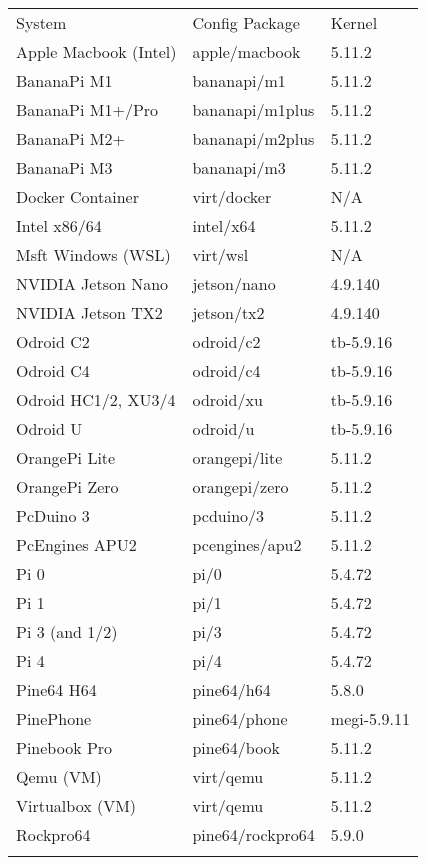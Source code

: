 \documentclass[english,]{IEEEtran}
\let\endhead\relax
\begin{document}
\begin{longtable}[]{@{}lll@{}}
\toprule
System & Config Package & Kernel \\ \addlinespace
\midrule
\endhead
Apple Macbook (Intel) & apple/macbook & 5.11.2 \\ \addlinespace
BananaPi M1 & bananapi/m1 & 5.11.2 \\ \addlinespace
BananaPi M1+/Pro & bananapi/m1plus & 5.11.2 \\ \addlinespace
BananaPi M2+ & bananapi/m2plus & 5.11.2 \\ \addlinespace
BananaPi M3 & bananapi/m3 & 5.11.2 \\ \addlinespace
Docker Container & virt/docker & N/A \\ \addlinespace
Intel x86/64 & intel/x64 & 5.11.2 \\ \addlinespace
Msft Windows (WSL) & virt/wsl & N/A \\ \addlinespace
NVIDIA Jetson Nano & jetson/nano & 4.9.140 \\ \addlinespace
NVIDIA Jetson TX2 & jetson/tx2 & 4.9.140 \\ \addlinespace
Odroid C2 & odroid/c2 & tb-5.9.16 \\ \addlinespace
Odroid C4 & odroid/c4 & tb-5.9.16 \\ \addlinespace
Odroid HC1/2, XU3/4 & odroid/xu & tb-5.9.16 \\ \addlinespace
Odroid U & odroid/u & tb-5.9.16 \\ \addlinespace
OrangePi Lite & orangepi/lite & 5.11.2 \\ \addlinespace
OrangePi Zero & orangepi/zero & 5.11.2 \\ \addlinespace
PcDuino 3 & pcduino/3 & 5.11.2 \\ \addlinespace
PcEngines APU2 & pcengines/apu2 & 5.11.2 \\ \addlinespace
Pi 0 & pi/0 & 5.4.72 \\ \addlinespace
Pi 1 & pi/1 & 5.4.72 \\ \addlinespace
Pi 3 (and 1/2) & pi/3 & 5.4.72 \\ \addlinespace
Pi 4 & pi/4 & 5.4.72 \\ \addlinespace
Pine64 H64 & pine64/h64 & 5.8.0 \\ \addlinespace
PinePhone & pine64/phone & megi-5.9.11 \\ \addlinespace
Pinebook Pro & pine64/book & 5.11.2 \\ \addlinespace
Qemu (VM) & virt/qemu & 5.11.2 \\ \addlinespace
Virtualbox (VM) & virt/qemu & 5.11.2 \\ \addlinespace
Rockpro64 & pine64/rockpro64 & 5.9.0 \\ \addlinespace
\bottomrule
\end{longtable}
\end{document}
